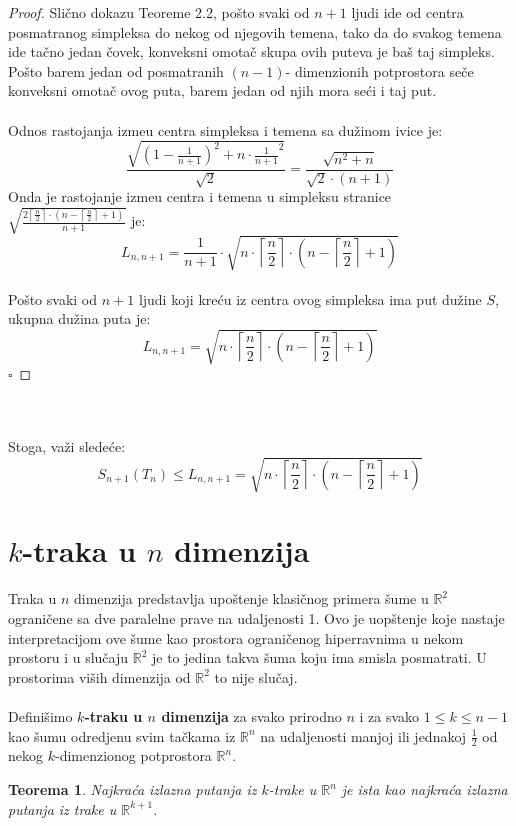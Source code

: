 \documentclass[11pt,letter]{article}
\newtheorem{teo}{\bf Teorema}[section]
\begin{document}
\begin{proof}
Sli\v cno dokazu Teoreme 2.2, po\v sto svaki od $n+1$ ljudi ide od centra posmatranog simpleksa do nekog od njegovih temena, tako da do svakog temena ide ta\v cno jedan \v covek, konveksni omota\v c skupa ovih puteva je ba\v s taj simpleks. Po\v sto barem jedan od posmatranih $(n-1)$- dimenzionih potprostora se\v ce konveksni omota\v c ovog puta, barem jedan od njih mora se\' ci i taj put. 
\\
\\
\indent Odnos rastojanja izme\dj u centra simpleksa i temena sa du\v zinom ivice je:
$$\frac{\sqrt{\left( 1-\frac{1}{n+1}\right)^2+n\cdot{\frac{1}{n+1}}^2}}{\sqrt2}=\frac{\sqrt{n^2+n}}{\sqrt2 \cdot(n+1)}$$
\indent Onda je rastojanje izme\dj u centra i temena u simpleksu stranice  $\sqrt{\frac{2\left\lceil \frac{n}{2}\right\rceil\cdot \left( n-\left\lceil\frac{n}{2}\right\rceil+1\right)}{n+1}}$ je:
\\
$$L_{n,n+1}=\frac{1}{n+1}\cdot\sqrt{n\cdot\left\lceil\frac{n}{2}\right\rceil\cdot\left( n-\left\lceil\frac{n}{2}\right\rceil+1\right)}$$
\\
\indent Po\v sto svaki od $n+1$ ljudi koji kre\' cu iz centra ovog simpleksa ima put du\v zine $S$, ukupna du\v zina puta je:
\\
$$L_{n,n+1}=\sqrt{n\cdot\left\lceil\frac{n}{2}\right\rceil\cdot\left( n-\left\lceil\frac{n}{2}\right\rceil +1\right)}$$
$\square$
\end{proof}
\\
\\
\indent Stoga, va\v zi slede\' ce:
$$S_{n+1}(T_n)\leqslant L_{n,n+1}= \sqrt{n\cdot\left\lceil\frac{n}{2}\right\rceil\cdot\left( n-\left\lceil\frac{n}{2}\right\rceil +1\right)}$$

\section[$k$-traka u $n$ dimenzija]{$k$-traka u $n$ dimenzija}
\bigskip
\indent Traka u $n$ dimenzija predstavlja upo\v stenje klasi\v cnog primera \v sume u $\mathbb{R}^2$ ograni\v cene sa dve paralelne prave na udaljenosti 1. Ovo je uop\v stenje koje nastaje interpretacijom ove \v sume kao prostora ograni\v cenog hiperravnima u nekom prostoru i u slu\v caju $\mathbb{R}^2$ je to jedina takva \v suma koju ima smisla posmatrati. U prostorima vi\v sih dimenzija od $\mathbb{R}^2$ to nije slu\v caj.
\\
\smallskip
\\
\indent Defini\v simo \textbf{$k$-traku u $n$ dimenzija} za svako prirodno $n$ i za svako $1\leqslant k\leqslant n-1$  kao \v sumu odredjenu svim ta\v ckama iz $\mathbb{R}^n$ na udaljenosti manjoj ili jednakoj $\frac{1}{2}$ od nekog $k$-dimenzionog potprostora $\mathbb{R}^n$. 
\\
\begin{teo} Najkra\' ca izlazna putanja iz $k$-trake u $\mathbb{R}^n$ je ista kao najkra\' ca izlazna putanja iz trake u $\mathbb{R}^{k+1}$.\end{teo}
\end{document}
